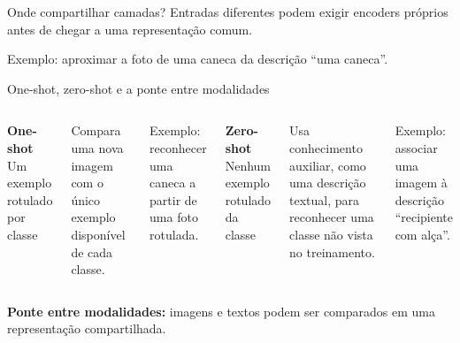 \documentclass[aspectratio=169,11pt]{beamer}
\newcommand{\painel}[2]{%
  \colorbox{Claro}{\parbox[c][19mm][c]{\dimexpr#1-2\fboxsep\relax}{\centering #2}}%
}
\begin{document}
\begin{frame}[t]{Onde compartilhar camadas?}
\medskip
Entradas diferentes podem exigir encoders próprios antes de chegar a uma representação comum.
\vfill
\centering
{}\par
\vfill
{\small\color{Suave}Exemplo: aproximar a foto de uma caneca da descrição ``uma caneca''.\par}
\end{frame}

\begin{frame}[t]{One-shot, zero-shot e a ponte entre modalidades}
\smallskip
\begin{columns}[onlytextwidth,T]
  \painel{\linewidth}{\textbf{One-shot}\\Um exemplo rotulado por classe}
  \smallskip
  {\small Compara uma nova imagem com o único exemplo disponível de cada classe.\par}
  \smallskip
  {\small\color{Suave}Exemplo: reconhecer uma caneca a partir de uma foto rotulada.\par}
  \painel{\linewidth}{\textbf{Zero-shot}\\Nenhum exemplo rotulado da classe}
  \smallskip
  {\small Usa conhecimento auxiliar, como uma descrição textual, para reconhecer uma classe não vista no treinamento.\par}
  \smallskip
  {\small\color{Suave}Exemplo: associar uma imagem à descrição ``recipiente com alça''.\par}
\end{columns}
\vfill
{\centering\small\color{Azul}\textbf{Ponte entre modalidades:} imagens e textos podem ser comparados em uma representação compartilhada.\par}
\end{frame}
\end{document}
